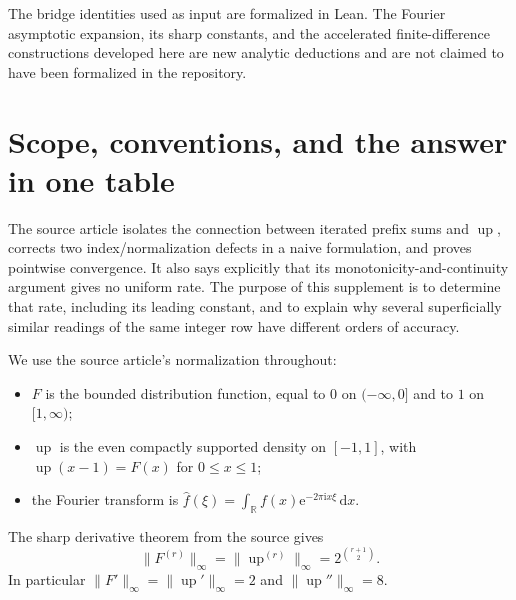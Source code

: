 \documentclass[11pt,oneside]{article}
\theoremstyle{definition}
\theoremstyle{remark}
\newcommand{\R}{\mathbb R}
\newcommand{\Up}{\operatorname{up}}
\newcommand{\e}{\mathrm e}
\newcommand{\ii}{\mathrm i}
\newcommand{\dd}{\,\mathrm d}
\begin{document}
The bridge identities used as input are formalized in Lean.  The Fourier asymptotic expansion,
its sharp constants, and the accelerated finite-difference constructions developed here are
new analytic deductions and are not claimed to have been formalized in the repository.


\section{Scope, conventions, and the answer in one table}
\label{tmrates:sec:scope}

The source article \cite{tmrates:reshetnikovExposition} isolates the connection between iterated
prefix sums and $\Up$, corrects two index/normalization defects in a naive formulation, and
proves pointwise convergence.  It also says explicitly that its monotonicity-and-continuity
argument gives no uniform rate.  The purpose of this supplement is to determine that rate,
including its leading constant, and to explain why several superficially similar readings of
the same integer row have different orders of accuracy.

We use the source article's normalization throughout:
\begin{itemize}
\item $F$ is the bounded distribution function, equal to $0$ on $(-\infty,0]$ and to $1$ on
      $[1,\infty)$;
\item $\Up$ is the even compactly supported density on $[-1,1]$, with
      $\Up(x-1)=F(x)$ for $0\le x\le1$;
\item the Fourier transform is
      $\widehat f(\xi)=\int_{\R}f(x)\e^{-2\pi\ii x\xi}\dd x$.
\end{itemize}
The sharp derivative theorem from the source gives
\begin{equation}
 \|F^{(r)}\|_\infty=\|\Up^{(r)}\|_\infty
 =2^{\binom{r+1}{2}}.                                      \label{tmrates:eq:sharp-derivatives}
\end{equation}
In particular $\|F'\|_\infty=\|\Up'\|_\infty=2$ and
$\|\Up''\|_\infty=8$.
\end{document}
